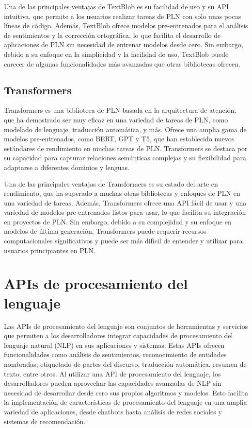 Una de las principales ventajas de TextBlob es su facilidad de uso y su API intuitiva, que permite a los usuarios realizar tareas de PLN con solo unas pocas líneas de código. Además, TextBlob ofrece modelos pre-entrenados para el análisis de sentimientos y la corrección ortográfica, lo que facilita el desarrollo de aplicaciones de PLN sin necesidad de entrenar modelos desde cero. Sin embargo, debido a su enfoque en la simplicidad y la facilidad de uso, TextBlob puede carecer de algunas funcionalidades más avanzadas que otras bibliotecas ofrecen.

\subsection{Transformers}

Transformers es una biblioteca de PLN basada en la arquitectura de atención, que ha demostrado ser muy eficaz en una variedad de tareas de PLN, como modelado de lenguaje, traducción automática, y más. Ofrece una amplia gama de modelos pre-entrenados, como BERT, GPT y T5, que han establecido nuevos estándares de rendimiento en muchas tareas de PLN. Transformers se destaca por su capacidad para capturar relaciones semánticas complejas y su flexibilidad para adaptarse a diferentes dominios y lenguas.

Una de las principales ventajas de Transformers es su estado del arte en rendimiento, que ha superado a muchas otras bibliotecas y enfoques de PLN en una variedad de tareas. Además, Transformers ofrece una API fácil de usar y una variedad de modelos pre-entrenados listos para usar, lo que facilita su integración en proyectos de PLN. Sin embargo, debido a su complejidad y su enfoque en modelos de última generación, Transformers puede requerir recursos computacionales significativos y puede ser más difícil de entender y utilizar para usuarios principiantes en PLN.

\section{APIs de procesamiento del lenguaje}

Las APIs de procesamiento del lenguaje son conjuntos de herramientas y servicios que permiten a los desarrolladores integrar capacidades de procesamiento del lenguaje natural (NLP) en sus aplicaciones y sistemas. Estas APIs ofrecen funcionalidades como análisis de sentimientos, reconocimiento de entidades nombradas, etiquetado de partes del discurso, traducción automática, resumen de texto, entre otros. Al utilizar una API de procesamiento del lenguaje, los desarrolladores pueden aprovechar las capacidades avanzadas de NLP sin necesidad de desarrollar desde cero sus propios algoritmos y modelos. Esto facilita la implementación de características de procesamiento del lenguaje en una amplia variedad de aplicaciones, desde chatbots hasta análisis de redes sociales y sistemas de recomendación.

